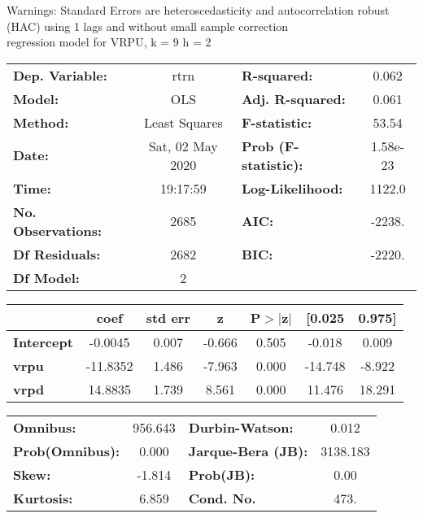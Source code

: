 Warnings: \newline
 [1] Standard Errors are heteroscedasticity and autocorrelation robust (HAC) using 1 lags and without small sample correction\\ 

regression model for VRPU, k = 9 h = 2\begin{center}
\begin{tabular}{lclc}
\toprule
\textbf{Dep. Variable:}    &       rtrn       & \textbf{  R-squared:         } &     0.062   \\
\textbf{Model:}            &       OLS        & \textbf{  Adj. R-squared:    } &     0.061   \\
\textbf{Method:}           &  Least Squares   & \textbf{  F-statistic:       } &     53.54   \\
\textbf{Date:}             & Sat, 02 May 2020 & \textbf{  Prob (F-statistic):} &  1.58e-23   \\
\textbf{Time:}             &     19:17:59     & \textbf{  Log-Likelihood:    } &    1122.0   \\
\textbf{No. Observations:} &        2685      & \textbf{  AIC:               } &    -2238.   \\
\textbf{Df Residuals:}     &        2682      & \textbf{  BIC:               } &    -2220.   \\
\textbf{Df Model:}         &           2      & \textbf{                     } &             \\
\bottomrule
\end{tabular}
\begin{tabular}{lcccccc}
                   & \textbf{coef} & \textbf{std err} & \textbf{z} & \textbf{P$> |$z$|$} & \textbf{[0.025} & \textbf{0.975]}  \\
\midrule
\textbf{Intercept} &      -0.0045  &        0.007     &    -0.666  &         0.505        &       -0.018    &        0.009     \\
\textbf{vrpu}      &     -11.8352  &        1.486     &    -7.963  &         0.000        &      -14.748    &       -8.922     \\
\textbf{vrpd}      &      14.8835  &        1.739     &     8.561  &         0.000        &       11.476    &       18.291     \\
\bottomrule
\end{tabular}
\begin{tabular}{lclc}
\textbf{Omnibus:}       & 956.643 & \textbf{  Durbin-Watson:     } &    0.012  \\
\textbf{Prob(Omnibus):} &   0.000 & \textbf{  Jarque-Bera (JB):  } & 3138.183  \\
\textbf{Skew:}          &  -1.814 & \textbf{  Prob(JB):          } &     0.00  \\
\textbf{Kurtosis:}      &   6.859 & \textbf{  Cond. No.          } &     473.  \\
\bottomrule
\end{tabular}
\end{center}

